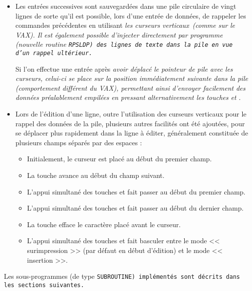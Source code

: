 \documentclass[a4paper,12pt,titlepage]{article}
\begin{document}
\begin{itemize}
  \item Les entr\'ees successives sont sauvegard\'ees dans une pile
   circulaire de vingt lignes de sorte qu'il est possible, lors d'une
   entr\'ee de donn\'ees, de rappeler les commandes pr\'ec\'edentes en
   utilisant \em les curseurs verticaux\em\ (comme sur le VAX). Il est
   \'egalement possible d'injecter directement par programme (nouvelle
   routine \tt RPSLDP\rm) des lignes de texte dans la pile en vue d'un
   rappel ult\'erieur.

   Si l'on effectue une entr\'ee apr\`es \em avoir
d\'eplac\'e le pointeur de pile avec les curseurs\em, celui-ci se
place sur la position imm\'ediatement suivante dans la pile
(comportement diff\'erent du VAX), permettant ainsi d'envoyer facilement des
donn\'ees pr\'ea\-lablement empil\'ees en pressant alternativement les touches
\framebox{$\downarrow$} et .

  \item Lors de l'\'edition d'une ligne, outre l'utilisation des curseurs
verticaux pour le rappel des donn\'ees de la pile, plusieurs autres
facilit\'es ont \'et\'e ajout\'ees, pour se d\'eplacer plus rapidement dans
la ligne \`a \'editer, g\'en\'eralement constitu\'ee de plusieurs champs
s\'epar\'es par des espaces :

       \begin{itemize}
            \item Initialement, le curseur est plac\'e au d\'ebut du premier
champ.
            \item La touche  avance au d\'ebut du champ
suivant.
            \item L'appui simultan\'e des touches  et
 fait passer au d\'ebut du premier champ.
            \item L'appui simultan\'e des touches  et
 fait passer au d\'ebut du dernier champ.
            \item La touche  efface le caract\`ere plac\'e
avant le curseur.
            \item L'appui simultan\'e des touches  et
 fait basculer entre le mode << surimpression >> (par d\'efaut en
d\'ebut d'\'edition) et le mode << insertion >>.
       \end{itemize}

\end{itemize}

    Les sous-programmes (de type \tt SUBROUTINE\rm) impl\'ement\'es sont
d\'ecrits dans les sections suivantes.
\end{document}
